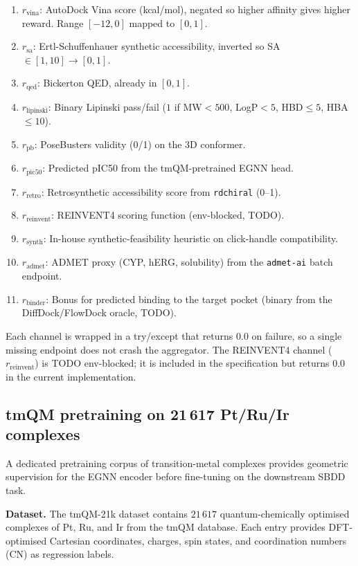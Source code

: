 \documentclass[10pt]{article}
\begin{document}
\begin{enumerate}
  \item $r_{\text{vina}}$: AutoDock Vina score (kcal/mol), negated so higher
    affinity gives higher reward.  Range $[-12,0]$ mapped to $[0,1]$.
  \item $r_{\text{sa}}$: Ertl-Schuffenhauer synthetic accessibility, inverted
    so SA$\in[1,10]\to[0,1]$.
  \item $r_{\text{qed}}$: Bickerton QED, already in $[0,1]$.
  \item $r_{\text{lipinski}}$: Binary Lipinski pass/fail ($1$ if MW$<500$,
    LogP$<5$, HBD$\le5$, HBA$\le10$).
  \item $r_{\text{pb}}$: PoseBusters validity (0/1) on the 3D conformer.
  \item $r_{\text{pic50}}$: Predicted pIC50 from the tmQM-pretrained EGNN head.
  \item $r_{\text{retro}}$: Retrosynthetic accessibility score from
    \texttt{rdchiral} (0--1).
  \item $r_{\text{reinvent}}$: REINVENT4 scoring function (env-blocked, TODO).
  \item $r_{\text{synth}}$: In-house synthetic-feasibility heuristic on
    click-handle compatibility.
  \item $r_{\text{admet}}$: ADMET proxy (CYP, hERG, solubility) from the
    \texttt{admet-ai} batch endpoint.
  \item $r_{\text{binder}}$: Bonus for predicted binding to the target pocket
    (binary from the DiffDock/FlowDock oracle, TODO).
\end{enumerate}

Each channel is wrapped in a try/except that returns $0.0$ on failure, so a
single missing endpoint does not crash the aggregator.  The REINVENT4 channel
($r_{\text{reinvent}}$) is TODO env-blocked; it is included in the specification
but returns $0.0$ in the current implementation.

\subsection{tmQM pretraining on 21\,617 Pt/Ru/Ir complexes}

A dedicated pretraining corpus of transition-metal complexes provides geometric
supervision for the EGNN encoder before fine-tuning on the downstream SBDD
task.

\medskip\noindent\textbf{Dataset.}
The tmQM-21k dataset contains $21\,617$ quantum-chemically optimised
complexes of Pt, Ru, and Ir from the tmQM database.  Each entry provides
DFT-optimised Cartesian coordinates, charges, spin states, and coordination
numbers (CN) as regression labels.
\end{document}
